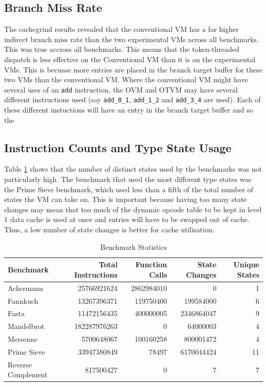 \documentclass[english,a4paper,12pt]{report}
\begin{document}
\subsection{Branch Miss Rate}
The cachegrind results revealed that the conventional VM has a far
higher indirect branch miss rate than the two experimental VMs across
all benchmarks. This was true accross all benchmarks. This means that
the token-threaded dispatch is less effective on the Conventional VM
than it is on the experimental VMs. This is becuase more entries are
placed in the branch target buffer for these two VMs than the
conventional VM. Where the conventional VM might have several uses of
an \verb|add| instruction, the OVM and OTVM may have several different
instructions used (say \verb|add_0_1|, \verb|add_1_2| and
\verb|add_3_4| are used). Each of these different instuctions will
have an entry in the branch target buffer and so the 

\subsection{Instruction Counts and Type State Usage}
Table \ref{tab:stats} shows that the number of distinct states used by
the benchmarks was not particularly high. The benchmark that used the
most different type states was the Prime Sieve benchmark, which used
less than a fifth of the total number of states the VM can take
on. This is important because having too many state changes may mean
that too much of the dynamic opcode table to be kept in level 1 data
cache is used at once and entries will have to be swapped out of
cache. Thus, a low number of state changes is better for cache
utilisation.

\begin{table}[!htb]
  \centering
  \begin{center}
    \begin{tabular}{lrrrr}
      Benchmark & Total Instructions & Function Calls & State Changes & Unique States\\
      \hline
      Ackermann & 25766921624 & 2862984010 & 0 & 1\\
      Fannkuch & 13267396371 & 119750400 & 199584000 & 6\\
      Fasta & 11472156435 & 400000005 & 2346864047 & 9\\
      Mandelbrot & 182287976263 & 0 & 64000003 & 4\\
      Mersenne & 5700648067 & 100160258 & 800001472 & 4\\
      Prime Sieve & 33947380849 & 78497 & 6170044424 & 11\\
      Reverse Complement & 817500427 & 0 & 7 & 7\\
    \end{tabular}
  \end{center}
  \caption{Benchmark Statistics}
  \label{tab:stats}
\end{table}
\end{document}
